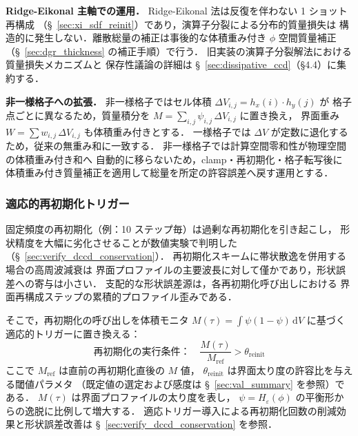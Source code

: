 \textbf{Ridge-Eikonal 主軸での運用．}
Ridge-Eikonal 法は反復を伴わない 1 ショット再構成
（§~\ref{sec:xi_sdf_reinit}）であり，演算子分裂による分布的質量損失は
構造的に発生しない．離散総量の補正は事後的な体積重み付き
$\phi$ 空間質量補正（§~\ref{sec:dgr_thickness} の補正手順）で行う．
旧実装の演算子分裂解法における質量損失メカニズムと
保存性議論の詳細は §~\ref{sec:dissipative_ccd}（§4.4）に集約する．

\textbf{非一様格子への拡張．}
非一様格子ではセル体積 $\Delta V_{i,j} = h_x(i) \cdot h_y(j)$ が
格子点ごとに異なるため，質量積分を
$M = \sum_{i,j} \psi_{i,j}\,\Delta V_{i,j}$ に置き換え，
界面重み $W = \sum w_{i,j}\,\Delta V_{i,j}$ も体積重み付きとする．
一様格子では $\Delta V$ が定数に退化するため，従来の無重み和に一致する．
非一様格子では計算空間零和性が物理空間の体積重み付き和へ
自動的に移らないため，clamp・再初期化・格子転写後に
体積重み付き質量補正を適用して総量を所定の許容誤差へ戻す運用とする．


\subsubsection{適応的再初期化トリガー}
\label{sec:adaptive_reinit}

固定頻度の再初期化（例：10 ステップ毎）は過剰な再初期化を引き起こし，
形状精度を大幅に劣化させることが数値実験で判明した
（§~\ref{sec:verify_dccd_conservation}）．
再初期化スキームに帯状散逸を併用する場合の高周波減衰は
界面プロファイルの主要波長に対して僅かであり，形状誤差への寄与は小さい．
支配的な形状誤差源は，各再初期化呼び出しにおける
界面再構成ステップの累積的プロファイル歪みである．

そこで，再初期化の呼び出しを体積モニタ $M(\tau) = \int \psi(1-\psi)\,\mathrm{d}V$
に基づく適応的トリガーに置き換える：
\begin{equation}
  \text{再初期化の実行条件：}\quad
  \frac{M(\tau)}{M_{\mathrm{ref}}} > \theta_{\mathrm{reinit}}
  \label{eq:adaptive_reinit_trigger}
\end{equation}
ここで $M_{\mathrm{ref}}$ は直前の再初期化直後の $M$ 値，
$\theta_{\mathrm{reinit}}$ は界面太り度の許容比を与える閾値パラメタ
（既定値の選定および感度は §~\ref{sec:val_summary} を参照）である．
$M(\tau)$ は界面プロファイルの太り度を表し，
$\psi = H_\varepsilon(\phi)$ の平衡形からの逸脱に比例して増大する．
適応トリガー導入による再初期化回数の削減効果と形状誤差改善は
§~\ref{sec:verify_dccd_conservation} を参照．


